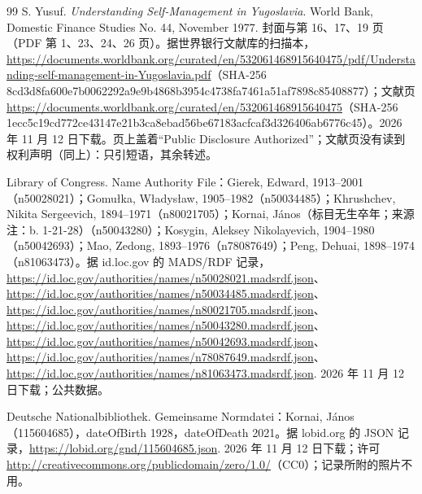 \begin{thebibliography}{99}
 S. Yusuf. \emph{Understanding Self-Management in Yugoslavia}. World Bank, Domestic Finance Studies No. 44, November 1977. 封面与第 16、17、19 页（PDF 第 1、23、24、26 页）。据世界银行文献库的扫描本，\url{https://documents.worldbank.org/curated/en/532061468915640475/pdf/Understanding-self-management-in-Yugoslavia.pdf}（SHA-256 8cd3d8fa600e7b0062292a9e9b4868b3954c4738fa7461a51af7898c85408877）；文献页 \url{https://documents.worldbank.org/curated/en/532061468915640475}（SHA-256 1ecc5c19cd772ce43147e21b3ca8ebad56be67183acfcaf3d326406ab6776c45）。2026 年 11 月 12 日下载。页上盖着“Public Disclosure Authorized”；文献页没有读到权利声明（同上）：只引短语，其余转述。

 Library of Congress. Name Authority File：Gierek, Edward, 1913--2001（n50028021）；Gomułka, Władysław, 1905--1982（n50034485）；Khrushchev, Nikita Sergeevich, 1894--1971（n80021705）；Kornai, János（标目无生卒年；来源注：b. 1-21-28）（n50043280）；Kosygin, Aleksey Nikolayevich, 1904--1980（n50042693）；Mao, Zedong, 1893--1976（n78087649）；Peng, Dehuai, 1898--1974（n81063473）。据 id.loc.gov 的 MADS/RDF 记录，\url{https://id.loc.gov/authorities/names/n50028021.madsrdf.json}、\url{https://id.loc.gov/authorities/names/n50034485.madsrdf.json}、\url{https://id.loc.gov/authorities/names/n80021705.madsrdf.json}、\url{https://id.loc.gov/authorities/names/n50043280.madsrdf.json}、\url{https://id.loc.gov/authorities/names/n50042693.madsrdf.json}、\url{https://id.loc.gov/authorities/names/n78087649.madsrdf.json}、\url{https://id.loc.gov/authorities/names/n81063473.madsrdf.json}. 2026 年 11 月 12 日下载；公共数据。

 Deutsche Nationalbibliothek. Gemeinsame Normdatei：Kornai, János（115604685），dateOfBirth 1928，dateOfDeath 2021。据 lobid.org 的 JSON 记录，\url{https://lobid.org/gnd/115604685.json}. 2026 年 11 月 12 日下载；许可 \url{http://creativecommons.org/publicdomain/zero/1.0/}（CC0）；记录所附的照片不用。


\end{thebibliography}
